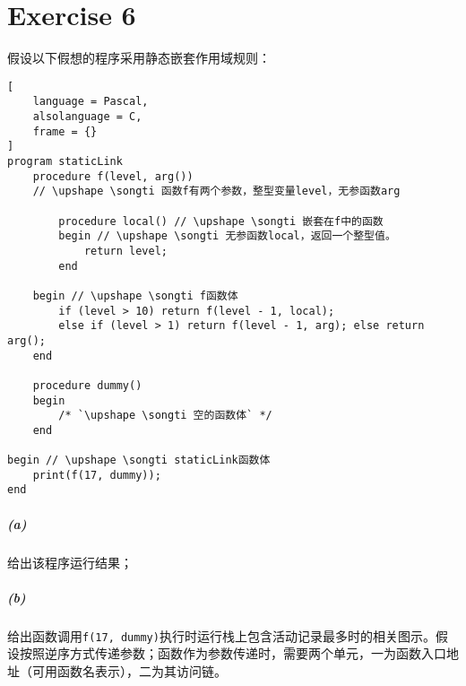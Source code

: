 \documentclass{article}
\begin{document}
\section*{Exercise 6}
假设以下假想的程序采用静态嵌套作用域规则：
\begin{lstlisting}[
    language = Pascal,
    alsolanguage = C,
    frame = {}
]
program staticLink
    procedure f(level, arg())
    // \upshape \songti 函数f有两个参数，整型变量level，无参函数arg

        procedure local() // \upshape \songti 嵌套在f中的函数
        begin // \upshape \songti 无参函数local，返回一个整型值。
            return level;
        end

    begin // \upshape \songti f函数体
        if (level > 10) return f(level - 1, local);
        else if (level > 1) return f(level - 1, arg); else return arg();
    end

    procedure dummy()
    begin
        /* `\upshape \songti 空的函数体` */
    end

begin // \upshape \songti staticLink函数体
    print(f(17, dummy));
end
\end{lstlisting}
\subparagraph*{(a)}
给出该程序运行结果；
\subparagraph*{(b)}
给出函数调用\lstinline{f(17, dummy)}执行时运行栈上包含活动记录最多时的相关图示。假设按照逆序方式传递参数；函数作为参数传递时，需要两个单元，一为函数入口地址（可用函数名表示），二为其访问链。
\end{document}
